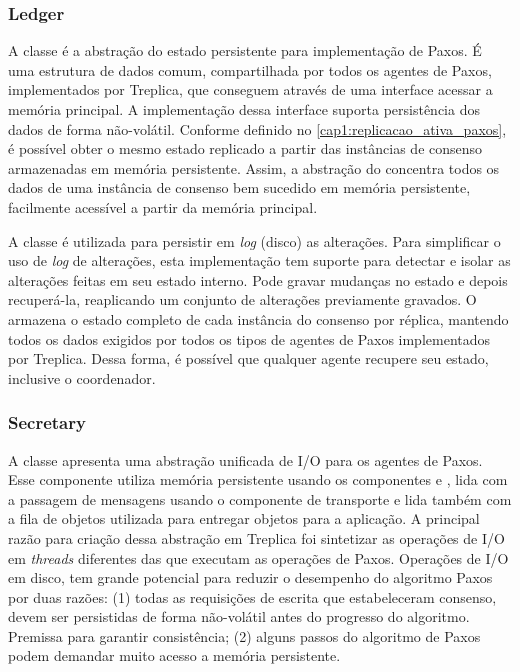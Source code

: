 \subsubsection{Ledger}

A classe  é a abstração do estado persistente para implementação de
Paxos. É uma estrutura de dados comum, compartilhada por todos os agentes de Paxos,
implementados por Treplica, que conseguem através de uma interface acessar a memória
principal. A implementação dessa interface suporta persistência dos dados de forma
não-volátil. Conforme definido no \autoref{cap1:replicacao_ativa_paxos}, é possível obter
o mesmo estado replicado a partir das instâncias de consenso armazenadas em memória
persistente. Assim, a abstração do  concentra todos os dados de uma
instância de consenso bem sucedido em memória persistente, facilmente acessível a partir
da memória principal.

A classe  é utilizada para persistir em \emph{log} (disco) as
alterações. Para simplificar o uso de \emph{log} de alterações, esta implementação tem
suporte para detectar e isolar as alterações feitas em seu estado interno. Pode gravar
mudanças no estado e depois recuperá-la, reaplicando um conjunto de alterações previamente
gravados. O  armazena o estado completo de cada instância do consenso
por réplica, mantendo todos os dados exigidos por todos os tipos de agentes de Paxos
implementados por Treplica. Dessa forma, é possível que qualquer agente recupere seu
estado, inclusive o coordenador.

\subsubsection{Secretary}

A classe  apresenta uma abstração unificada de I/O para os agentes de
Paxos. Esse componente utiliza memória persistente usando os componentes
 e , lida com a passagem de mensagens usando o
componente de transporte e lida também com a fila de objetos utilizada para entregar
objetos para a aplicação. A principal razão para criação dessa abstração em Treplica foi
sintetizar as operações de I/O em \emph{threads} diferentes das que executam as operações
de Paxos. Operações de I/O em disco, tem grande potencial para reduzir o desempenho do
algoritmo Paxos por duas razões: (1) todas as requisições de escrita que estabeleceram
consenso, devem ser persistidas de forma não-volátil antes do progresso do algoritmo.
Premissa para garantir consistência; (2) alguns passos do algoritmo de Paxos podem
demandar muito acesso a memória persistente.

